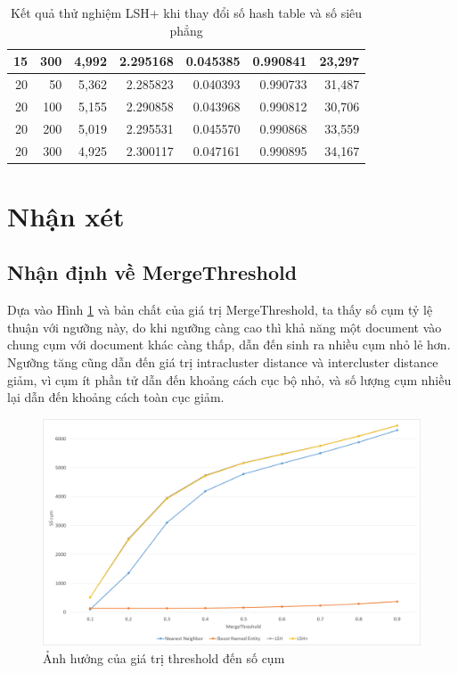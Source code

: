 \begin{table}
\begin{tabular}{|r|r|r|r|r|r|r|}
				\hline
				15            & 300           & 4,992         & 2.295168      & 0.045385      & 0.990841      & 23,297 \bigstrut\\
				\hline
				20            & 50            & 5,362         & 2.285823      & 0.040393      & 0.990733      & 31,487 \bigstrut\\
				\hline
				20            & 100           & 5,155         & 2.290858      & 0.043968      & 0.990812      & 30,706 \bigstrut\\
				\hline
				20            & 200           & 5,019         & 2.295531      & 0.045570      & 0.990868      & 33,559 \bigstrut\\
				\hline
				20            & 300           & 4,925         & 2.300117      & 0.047161      & 0.990895      & 34,167 \bigstrut\\
				\hline
			\end{tabular}%
			\caption{Kết quả thử nghiệm LSH+ khi thay đổi số hash table và số siêu phẳng }
			\label{tab:LSHParams}%
		\end{table}%
		
\section{Nhận xét}
	\subsection{Nhận định về MergeThreshold}
	Dựa vào Hình \ref{fig:thresholdvsclustercount} và bản chất của giá trị MergeThreshold, ta thấy số cụm tỷ lệ thuận với ngưỡng này, do khi ngưỡng càng cao thì khả năng một document vào chung cụm với document khác càng thấp, dẫn đến sinh ra nhiều cụm nhỏ lẻ hơn. Ngưỡng tăng cũng dẫn đến giá trị intracluster distance và intercluster distance giảm, vì cụm ít phần tử dẫn đến khoảng cách cục bộ nhỏ, và số lượng cụm nhiều lại dẫn đến khoảng cách toàn cục giảm.
		\begin{figure}
			\centering
			\includegraphics[width=1\linewidth]{Chapter4/Chapter4Figs/ThresholdVsClusterCount}
			\caption{Ảnh hưởng của giá trị threshold đến số cụm}
			\label{fig:thresholdvsclustercount}
		\end{figure}
		
